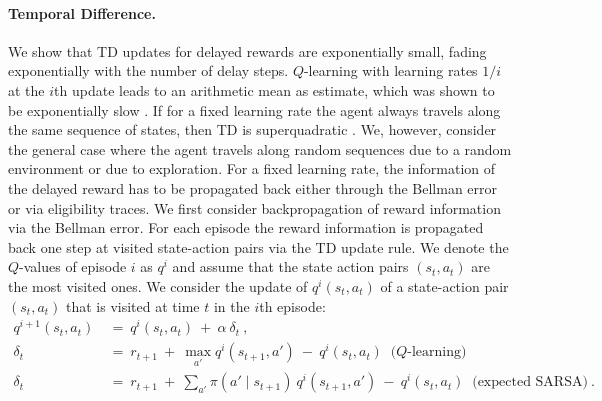 \documentclass{article}
\begin{document}
\begin{appendices}
\paragraph{Temporal Difference.}
We show that TD updates for delayed rewards are exponentially small,
fading exponentially with the number of delay steps.
$Q$-learning with learning rates $1/i$ at the $i$th update
leads to an arithmetic mean as estimate, which was shown to be
exponentially slow \cite{Beleznay:99}. 
If for a fixed learning rate the agent always travels along 
the same sequence of states, then TD is superquadratic \cite{Beleznay:99}.
We, however, consider the general case where the agent travels 
along random sequences due to a random environment or due to exploration.
For a fixed learning rate,
the information of the delayed reward has to be propagated back
either through the Bellman error or via eligibility traces.
We first consider backpropagation of reward information via the
Bellman error.
For each episode
the reward information is propagated back one step at visited
state-action pairs via the TD update rule.
We denote the $Q$-values of episode $i$ as $q^i$ and assume that the
state action pairs $(s_t,a_t)$ are the most visited ones.
We consider the update of $q^i(s_t,a_t)$ of
a state-action pair $(s_t,a_t)$ that is visited at time $t$ in
the $i$th episode: 
\begin{align}
 q^{i+1}(s_t,a_t) \ &= \ q^i(s_t,a_t) \ + \
 \alpha \ \delta_t \ , \\
\delta_t  \ &= \ r_{t+1} \ + \ \max_{a'} q^i(s_{t+1},a') \ - \
  q^i(s_t,a_t) \ \text{~($Q$-learning)}\\ 
\delta_t  \ &= \ r_{t+1} \ + \ \sum_{a'} \pi(a' \mid s_{t+1}) \ q^i(s_{t+1},a') \ - \
  q^i(s_t,a_t) \ \text{~(expected SARSA)} \ .
\end{align} 


\end{appendices}
\end{document}
